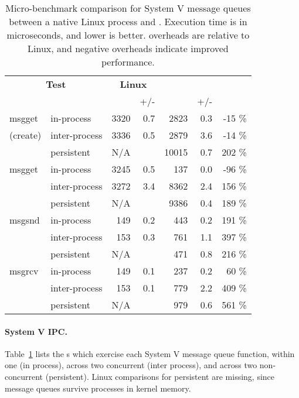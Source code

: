 \begin{table}[t!b!]
\footnotesize
\centering
\begin{tabular}{|ll|rr|rrr|}
\hline
\multicolumn{2}{|c|}{{\bf Test}} &
\multicolumn{2}{c|}{{\bf Linux}} &
\multicolumn{3}{c|}{{\bf \graphene{}}} \\
 & & \us{} & +/- & \us{} & +/- & \\
\hline
msgget   & in-process    & 3320	& 0.7 &  2823 & 0.3 &	-15	\%		\\
(create) & inter-process & 3336	& 0.5 &  2879 & 3.6 &	-14	\%		\\
         & persistent    &  N/A	&     & 10015 & 0.7 &	202	\%      \\
\hline								
msgget   & in-process    & 3245	& 0.5 &   137 & 0.0 &	-96	\%		\\
         & inter-process & 3272	& 3.4 &  8362 & 2.4 &	156	\%		\\
         & persistent    &  N/A	&     &  9386 & 0.4 &	189	\%      \\
\hline								
msgsnd   & in-process    &  149	& 0.2 &   443 & 0.2 &	191	\%		\\
         & inter-process &  153	& 0.3 &   761 & 1.1 &	397	\%		\\
         & persistent    &  N/A	&     &   471 & 0.8 &	216	\%	    \\
\hline								
msgrcv   & in-process    &  149	& 0.1 &   237 & 0.2 &	60	\%		\\
         & inter-process &  153	& 0.1 &   779 & 2.2 &	409	\%  	\\
         & persistent    &  N/A	&     &   979 & 0.6 &	561	\%	    \\
         \hline
\end{tabular}
\caption[The \microbench{} results for System V message queues in Linux, KVM, and \graphene{}]
{Micro-benchmark comparison for System V message queues
between a native Linux process and \graphene{} \picoprocs{}.
Execution time is in microseconds, and lower is better.
overheads are relative to Linux, and negative overheads indicate improved performance.}
\label{tab:graphene:msgq}
\end{table}

\paragraph{System V IPC.}
Table~\ref{tab:graphene:msgq} lists the \microbench{}s
which exercise each System V message queue function,
within one \picoproc{} (in process), across two concurrent \picoprocs{} (inter process),
and across two non-concurrent \picoprocs{} (persistent).
Linux comparisons for persistent are missing, since message queues 
survive processes in kernel memory.

